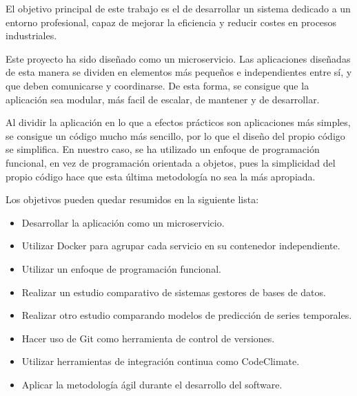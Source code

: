 
El objetivo principal de este trabajo es el de desarrollar un sistema dedicado a un entorno profesional, capaz 
de mejorar la eficiencia y reducir costes en procesos industriales.

Este proyecto ha sido diseñado como un microservicio. Las aplicaciones diseñadas de esta manera se dividen 
en elementos más pequeños e independientes entre sí, y que deben comunicarse y coordinarse. De esta 
forma, se consigue que la aplicación sea modular, más facil de escalar, de mantener y de desarrollar.

Al dividir la aplicación en lo que a efectos prácticos son aplicaciones más simples, se consigue un código 
mucho más sencillo, por lo que el diseño del propio código se simplifica. En nuestro caso, se ha utilizado 
un enfoque de programación funcional, en vez de programación orientada a objetos, pues la simplicidad del propio 
código hace que esta última metodología no sea la más apropiada.

Los objetivos pueden quedar resumidos en la siguiente lista:
\begin{itemize}
    \item Desarrollar la aplicación como un microservicio.
    \item Utilizar Docker para agrupar cada servicio en su contenedor independiente.
    \item Utilizar un enfoque de programación funcional.
    \item Realizar un estudio comparativo de sistemas gestores de bases de datos.
    \item Realizar otro estudio comparando modelos de predicción de series temporales.
    \item Hacer uso de Git como herramienta de control de versiones.
    \item Utilizar herramientas de integración continua como CodeClimate.
    \item Aplicar la metodología ágil durante el desarrollo del software.
\end{itemize}